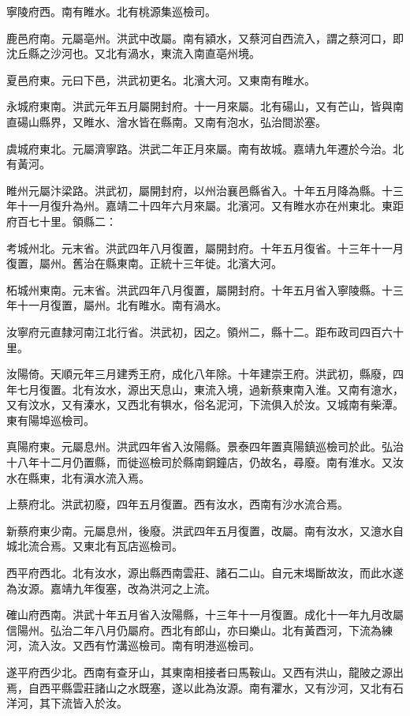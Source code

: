 寧陵府西。南有睢水。北有桃源集巡檢司。

鹿邑府南。元屬亳州。洪武中改屬。南有潁水，又蔡河自西流入，謂之蔡河口，即沈丘縣之沙河也。又北有渦水，東流入南直亳州境。

夏邑府東。元曰下邑，洪武初更名。北濱大河。又東南有睢水。

永城府東南。洪武元年五月屬開封府。十一月來屬。北有碭山，又有芒山，皆與南直碭山縣界，又睢水、澮水皆在縣南。又南有泡水，弘治間淤塞。

虞城府東北。元屬濟寧路。洪武二年正月來屬。南有故城。嘉靖九年遷於今治。北有黃河。

睢州元屬汴梁路。洪武初，屬開封府，以州治襄邑縣省入。十年五月降為縣。十三年十一月復升為州。嘉靖二十四年六月來屬。北濱河。又有睢水亦在州東北。東距府百七十里。領縣二：

考城州北。元末省。洪武四年八月復置，屬開封府。十年五月復省。十三年十一月復置，屬州。舊治在縣東南。正統十三年徙。北濱大河。

柘城州東南。元末省。洪武四年八月復置，屬開封府。十年五月省入寧陵縣。十三年十一月復置，屬州。北有睢水。南有渦水。

汝寧府元直隸河南江北行省。洪武初，因之。領州二，縣十二。距布政司四百六十里。

汝陽倚。天順元年三月建秀王府，成化八年除。十年建崇王府。洪武初，縣廢，四年七月復置。北有汝水，源出天息山，東流入境，過新蔡東南入淮。又南有澺水，又有汶水，又有溱水，又西北有犋水，俗名泥河，下流俱入於汝。又城南有柴潭。東有陽埠巡檢司。

真陽府東。元屬息州。洪武四年省入汝陽縣。景泰四年置真陽鎮巡檢司於此。弘治十八年十二月仍置縣，而徙巡檢司於縣南銅鐘店，仍故名，尋廢。南有淮水。又汝水在縣東，北有滇水流入焉。

上蔡府北。洪武初廢，四年五月復置。西有汝水，西南有沙水流合焉。

新蔡府東少南。元屬息州，後廢。洪武四年五月復置，改屬。南有汝水，又澺水自城北流合焉。又東北有瓦店巡檢司。

西平府西北。北有汝水，源出縣西南雲莊、諸石二山。自元末堨斷故汝，而此水遂為汝源。嘉靖九年復塞，改為洪河之上流。

確山府西南。洪武十年五月省入汝陽縣，十三年十一月復置。成化十一年九月改屬信陽州。弘治二年八月仍屬府。西北有郎山，亦曰樂山。北有黃酉河，下流為練河，流入汝。又西有竹溝巡檢司。南有明港巡檢司。

遂平府西少北。西南有查牙山，其東南相接者曰馬鞍山。又西有洪山，龍陂之源出焉，自西平縣雲莊諸山之水既塞，遂以此為汝源。南有灈水，又有沙河，又北有石洋河，其下流皆入於汝。

